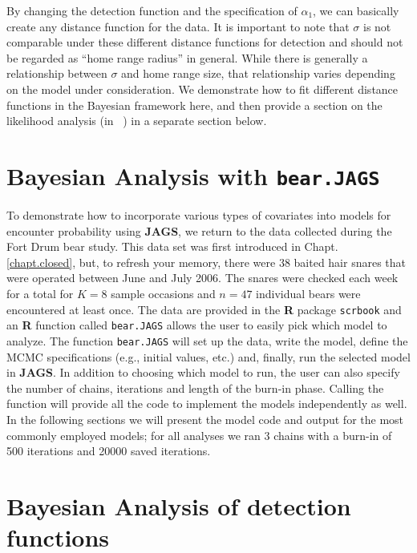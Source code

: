 By changing the detection function and the specification of
$\alpha_1$, we can basically create any distance function for the
data. It is important to note that $\sigma$ is not comparable under
these different distance functions for detection and should not be
regarded as ``home range radius'' in general.  While there is
generally a relationship between $\sigma$ and home range size, that
relationship varies depending on the model under consideration. We
demonstrate how to fit different distance functions in the Bayesian
framework here, and then provide a section on the likelihood analysis
(in \secr~) in a separate section below.

\section{Bayesian Analysis with {\tt bear.JAGS}}

To demonstrate how to incorporate various types of covariates into
models for encounter probability using {\bf JAGS}, we return to the
data collected during the Fort Drum bear study.  This data set was first
introduced in Chapt. \ref{chapt.closed}, but, to refresh your memory,
there were 38 baited hair snares that were operated between June and
July 2006.  The snares were checked each week for a total for $K=8$
sample occasions and $n=47$ individual bears were encountered at least
once.  The data are provided in the {\bf R} package \mbox{\tt scrbook}
and an {\bf R} function called {\tt bear.JAGS} allows the user to
easily pick which model to analyze.  The function {\tt bear.JAGS} will
set up the data, write the model, define the MCMC specifications
(e.g., initial values, etc.) and, finally, run the selected model in
{\bf JAGS}. In addition to choosing which model to run, the user can
also specify the number of chains, iterations and length of the
burn-in phase. Calling the function will provide all the code to
implement the models independently as well.  In the following sections
we will present the model code and output for the most commonly
employed models; for all analyses we ran 3 chains with a burn-in of
500 iterations and 20000 saved iterations.

\section{Bayesian Analysis of detection functions}

